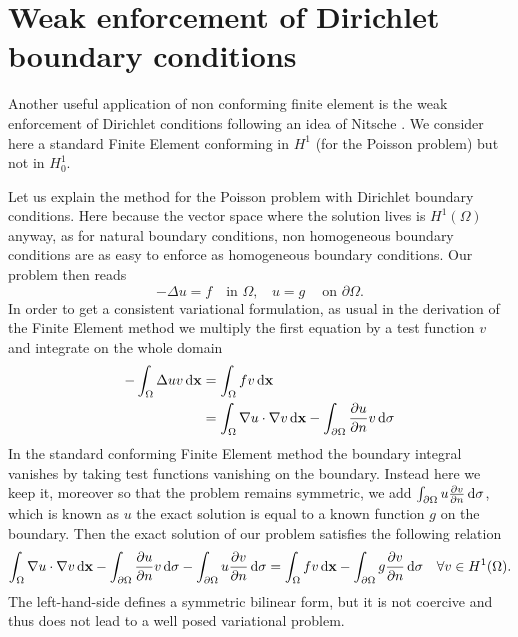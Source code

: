 \section{Weak enforcement of Dirichlet boundary conditions}

Another useful application of non conforming finite element is the weak enforcement of Dirichlet conditions following an idea of Nitsche \cite{nitsche1971}. We consider here a standard Finite Element conforming in $H^1$ (for the Poisson problem) but not in $H^1_0$. 

Let us explain the method for the Poisson problem with Dirichlet boundary conditions. Here because the vector space where the solution lives is $H^1(\Omega)$ anyway, as for natural boundary conditions, non homogeneous boundary conditions are as easy to enforce as homogeneous boundary conditions. Our problem then reads
$$-\Delta u= f ~~~ \mbox{ in } \Omega, ~~~~ u=g ~~~~\mbox{ on } \partial \Omega.$$
In order to get a consistent variational formulation,
as usual in the derivation of the Finite Element method we multiply the first equation by a test function $v$ and integrate on the whole domain
\begin{align*}
-\int_\Omega \Delta u v \,{\rm d} \mathbf{x} &= \int_\Omega f v  \,{\rm d} \mathbf{x} \\
& = \int_\Omega \nabla u \cdot \nabla v \,{\rm d} \mathbf{x} - \int_{\partial \Omega} \frac{\partial u}{\partial n} v \,{\rm d} \sigma
\end{align*}
In the standard conforming Finite Element method the boundary integral vanishes by taking test functions vanishing on the boundary.  Instead here we keep it, moreover so that the problem remains symmetric, we add $\int_{\partial \Omega} u \frac{\partial v}{\partial n} \,{\rm d} \sigma$, which is known as $u$ the exact solution is equal to a known function $g$  on the boundary. 
Then the exact solution of our problem satisfies the following relation
\begin{equation}\label{eq:nitsche_sym}
\int_\Omega \nabla u \cdot \nabla v \,{\rm d} \mathbf{x} 
- \int_{\partial \Omega} \frac{\partial u}{\partial n} v \,{\rm d} \sigma -\int_{\partial \Omega} u \frac{\partial v}{\partial n} \,{\rm d} \sigma =
 \int_\Omega f v  \,{\rm d} \mathbf{x}  -\int_{\partial \Omega} g \frac{\partial v}{\partial n}\,{\rm d}\sigma \quad\forall v\in H^1 (\Omega).
 \end{equation}
 The left-hand-side defines a symmetric bilinear form, but it is not coercive and thus does not lead to a well posed variational problem. 
 
